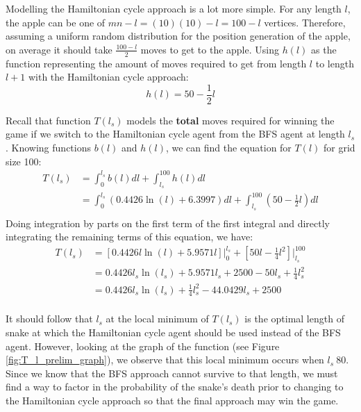 \documentclass[12pt]{article}
\begin{document}
Modelling the Hamiltonian cycle approach is a lot more simple. For any length $l$, the apple can be one of $mn-l=(10)(10)-l=100-l$ vertices. Therefore, assuming a uniform random distribution for the position generation of the apple, on average it should take $\frac{100-l}{2}$ moves to get to the apple. Using $h(l)$ as the function representing the amount of moves required to get from length $l$ to length $l+1$ with the Hamiltonian cycle approach:
\begin{equation}
h(l) = 50-\frac{1}{2}l
\end{equation}

Recall that function $T(l_{s})$ models the \textbf{total} moves required for winning the game if we switch to the Hamiltonian cycle agent from the BFS agent at length $l_{s}$. Knowing functions $b(l)$ and $h(l)$, we can find the equation for $T(l)$ for grid size 100:
\begin{equation}
\begin{split}
T(l_{s}) & = \int_{0}^{l_{s}} b(l)dl + \int_{l_{s}}^{100} h(l)dl \\
& = \int_{0}^{l_{s}} (0.4426\ln(l) + 6.3997) dl + \int_{l_{s}}^{100} (50-\frac{1}{2}l)dl\\
\end{split}
\end{equation}
Doing integration by parts on the first term of the first integral and directly integrating the remaining terms of this equation, we have:
\begin{equation}
\begin{split}
T(l_{s}) & = [0.4426l\ln(l) + 5.9571l] \Big|_{0}^{l_{s}} + [50l-\frac{1}{4}l^2] \Big|_{l_{s}}^{100} \\
& = 0.4426l_{s}\ln(l_{s}) + 5.9571l_{s} + 2500 - 50l_{s}+\frac{1}{4}l_{s}^2 \\
& = 0.4426l_{s}\ln(l_{s}) + \frac{1}{4}l_{s}^2 - 44.0429l_{s} + 2500 \\
\end{split}
\end{equation}

It should follow that $l_s$ at the local minimum of $T(l_s)$ is the optimal length of snake at which the Hamiltonian cycle agent should be used instead of the BFS agent. However, looking at the graph of the function (see Figure \ref{fig:T_l_prelim_graph}), we observe that this local minimum occurs when $l_s ~ 80$. Since we know that the BFS approach cannot survive to that length, we must find a way to factor in the probability of the snake's death prior to changing to the Hamiltonian cycle approach so that the final approach may win the game.
\end{document}
